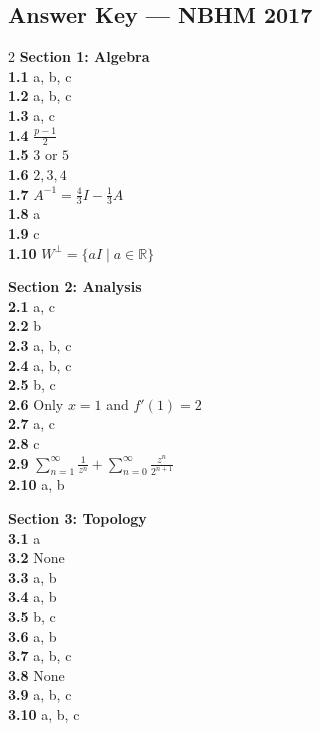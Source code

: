 \documentclass[11pt,a4paper]{article}
\newcommand{\R}{\mathbb{R}}
\newcommand{\examsec}[1]{%
  \subsection*{#1}
  \vspace{-2pt}
}
\begin{document}
\examsec{Answer Key --- NBHM 2017}
\begin{multicols}{2}
\textbf{Section 1: Algebra}\\
\textbf{1.1} a, b, c\\
\textbf{1.2} a, b, c\\
\textbf{1.3} a, c\\
\textbf{1.4} $\frac{p-1}{2}$\\
\textbf{1.5} $3$ or $5$\\
\textbf{1.6} $2, 3, 4$\\
\textbf{1.7} $A^{-1} = \frac{4}{3}I - \frac{1}{3}A$\\
\textbf{1.8} a\\
\textbf{1.9} c\\
\textbf{1.10} $W^\perp = \{aI \mid a \in \R\}$

\medskip
\textbf{Section 2: Analysis}\\
\textbf{2.1} a, c\\
\textbf{2.2} b\\
\textbf{2.3} a, b, c\\
\textbf{2.4} a, b, c\\
\textbf{2.5} b, c\\
\textbf{2.6} Only $x = 1$ and $f'(1) = 2$\\
\textbf{2.7} a, c\\
\textbf{2.8} c\\
\textbf{2.9} $\sum_{n=1}^{\infty} \frac{1}{z^n} + \sum_{n=0}^{\infty} \frac{z^n}{2^{n+1}}$\\
\textbf{2.10} a, b

\medskip
\textbf{Section 3: Topology}\\
\textbf{3.1} a\\
\textbf{3.2} None\\
\textbf{3.3} a, b\\
\textbf{3.4} a, b\\
\textbf{3.5} b, c\\
\textbf{3.6} a, b\\
\textbf{3.7} a, b, c\\
\textbf{3.8} None\\
\textbf{3.9} a, b, c\\
\textbf{3.10} a, b, c


\end{multicols}
\end{document}
